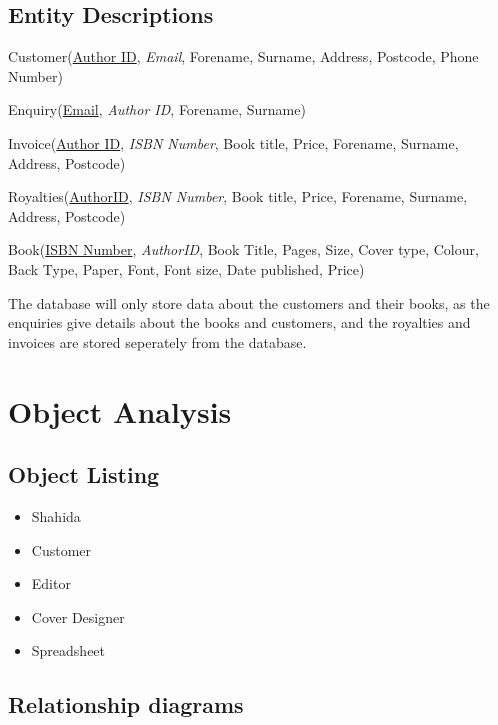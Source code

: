 \subsection{Entity Descriptions}

Customer(\underline{Author ID}, \emph{Email}, Forename, Surname, Address, Postcode, Phone Number)

Enquiry(\underline{Email}, \emph{Author ID}, Forename, Surname)

Invoice(\underline{Author ID}, \emph{ISBN Number}, Book title, Price, Forename, Surname, Address, Postcode)

Royalties(\underline{AuthorID}, \emph{ISBN Number}, Book title, Price, Forename, Surname, Address, Postcode)

Book(\underline{ISBN Number}, \emph{AuthorID}, Book Title, Pages, Size, Cover type, Colour, Back Type, Paper, Font, Font size, Date published, Price)

The database will only store data about the customers and their books, as the enquiries give details about the books and customers, and the royalties and invoices are stored seperately from the database.

\section{Object Analysis}

\subsection{Object Listing}

\begin{itemize}
    \item Shahida
    \item Customer
    \item Editor
    \item Cover Designer
    \item Spreadsheet

\end{itemize}

\subsection{Relationship diagrams}

